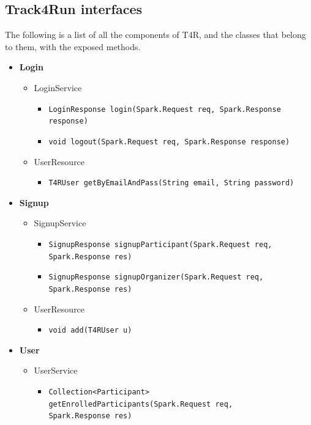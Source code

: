 \documentclass[a4paper, hidelinks, 12pt]{report}
\begin{document}
	\subsection{Track4Run interfaces}
	The following is a list of all the components of T4R, and the classes that belong to them, with the exposed methods.
	\begin{itemize}
		\item{\textbf{Login}}
			\begin{itemize}
				\item{LoginService}
					\begin{itemize}
						\item{\verb|LoginResponse login(Spark.Request req, Spark.Response response)|}
						\item{\verb|void logout(Spark.Request req, Spark.Response response)|}
					\end{itemize}
				\item{UserResource}
					\begin{itemize}
						\item{\verb|T4RUser getByEmailAndPass(String email, String password)|}
					\end{itemize}
			\end{itemize}
		\item{\textbf{Signup}}
			\begin{itemize}
				\item{SignupService}
					\begin{itemize}
						\item{\verb|SignupResponse signupParticipant(Spark.Request req, Spark.Response res)|}
						\item{\verb|SignupResponse signupOrganizer(Spark.Request req, Spark.Response res)|}
					\end{itemize}
				\item{UserResource}
					\begin{itemize}
						\item{\verb|void add(T4RUser u)|}
					\end{itemize}
			\end{itemize}
		\item{\textbf{User}}
			\begin{itemize}
				\item{UserService}
					\begin{itemize}
						\item{\verb|Collection<Participant> getEnrolledParticipants(Spark.Request req,|\\ \verb|Spark.Response res)|}

\end{itemize}
\end{itemize}
\end{itemize}
\end{document}
